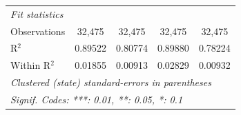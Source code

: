 \begin{tabular}{lcccc}
   \midrule
   \emph{Fit statistics}\\
   Observations                                     & 32,475             & 32,475                    & 32,475               & 32,475\\  
   R$^2$                                            & 0.89522            & 0.80774                   & 0.89880              & 0.78224\\  
   Within R$^2$                                     & 0.01855            & 0.00913                   & 0.02829              & 0.00932\\  
   \midrule \midrule
   \multicolumn{5}{l}{\emph{Clustered (state) standard-errors in parentheses}}\\
   \multicolumn{5}{l}{\emph{Signif. Codes: ***: 0.01, **: 0.05, *: 0.1}}\\
\end{tabular}
\par\endgroup


